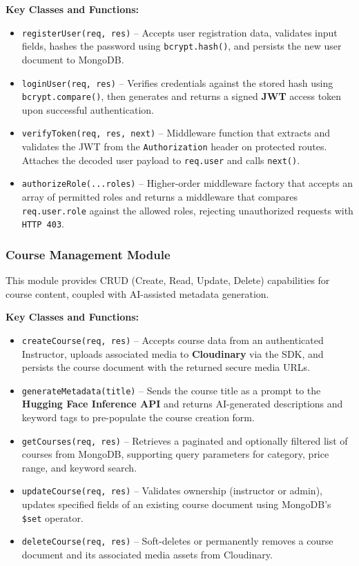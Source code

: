 \textbf{Key Classes and Functions:}
\begin{itemize}
    \item \texttt{registerUser(req, res)} -- Accepts user registration data, validates input fields, hashes the password using \texttt{bcrypt.hash()}, and persists the new user document to MongoDB.
    \item \texttt{loginUser(req, res)} -- Verifies credentials against the stored hash using \texttt{bcrypt.compare()}, then generates and returns a signed \textbf{JWT} access token upon successful authentication.
    \item \texttt{verifyToken(req, res, next)} -- Middleware function that extracts and validates the JWT from the \texttt{Authorization} header on protected routes. Attaches the decoded user payload to \texttt{req.user} and calls \texttt{next()}.
    \item \texttt{authorizeRole(...roles)} -- Higher-order middleware factory that accepts an array of permitted roles and returns a middleware that compares \texttt{req.user.role} against the allowed roles, rejecting unauthorized requests with \texttt{HTTP 403}.
\end{itemize}

\subsubsection{Course Management Module}

This module provides CRUD (Create, Read, Update, Delete) capabilities for course content, coupled with AI-assisted metadata generation.

\textbf{Key Classes and Functions:}
\begin{itemize}
    \item \texttt{createCourse(req, res)} -- Accepts course data from an authenticated Instructor, uploads associated media to \textbf{Cloudinary} via the SDK, and persists the course document with the returned secure media URLs.
    \item \texttt{generateMetadata(title)} -- Sends the course title as a prompt to the \textbf{Hugging Face Inference API} and returns AI-generated descriptions and keyword tags to pre-populate the course creation form.
    \item \texttt{getCourses(req, res)} -- Retrieves a paginated and optionally filtered list of courses from MongoDB, supporting query parameters for category, price range, and keyword search.
    \item \texttt{updateCourse(req, res)} -- Validates ownership (instructor or admin), updates specified fields of an existing course document using MongoDB's \texttt{\$set} operator.
    \item \texttt{deleteCourse(req, res)} -- Soft-deletes or permanently removes a course document and its associated media assets from Cloudinary.
\end{itemize}

